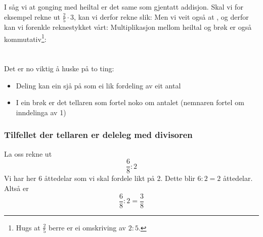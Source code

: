 \section{\brgngheil}
I  såg vi at gonging med heiltal er det same som gjentatt addisjon. Skal vi for eksempel rekne ut $ \frac{2}{5}\cdot 3 $, kan vi derfor rekne slik:
Men vi veit også at , og derfor kan vi forenkle reknestykket vårt:
Multiplikasjon mellom heiltal og brøk er også kommutativ\footnote{Hugs at $ \frac{2}{5} $ berre er ei omskriving av $ 2:5 $. }:

\newpage
{}

\newpage
\section{\brdelheil}
Det er no viktig å huske på to ting:
\begin{itemize}
	\item Deling kan ein sjå på som ei lik fordeling av eit antal
	\item I ein brøk er det tellaren som fortel noko om antalet (nemnaren fortel om inndelinga av 1)
\end{itemize}
\subsubsection{Tilfellet der tellaren er deleleg med divisoren}
La oss rekne ut 
\[ \frac{6}{8}:2 \]
Vi har her 6 åttedelar som vi skal fordele likt på 2. Dette blir $ 6:2=2 $ åttedelar.
Altså er
\[ \frac{6}{8}:2=\frac{3}{8} \]
\newpage
